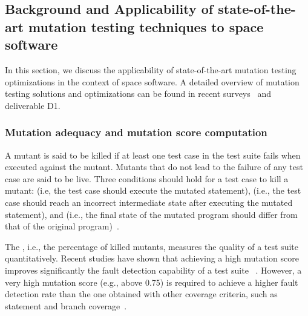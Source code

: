 
\subsection{Background and Applicability of state-of-the-art mutation testing techniques to space software}
\label{sec:background}

In this section, we discuss the applicability of state-of-the-art mutation testing optimizations in the context of space software. A detailed overview of mutation testing solutions and optimizations can be found in recent surveys~\cite{jia2010analysis,papadakis2019mutation} and deliverable D1.

\subsubsection{Mutation adequacy and mutation score computation}
\label{background:adequacy}
A mutant is said to be killed if at least one test case in the test suite fails when executed against the mutant.
Mutants that do not lead to the failure of any test case are said to be live.
Three conditions should hold for a test case to kill a mutant:  (i.e, the test case should execute the mutated statement),  (i.e., the test case should reach an incorrect intermediate state after executing the mutated statement), and  (i.e., the final state of the mutated program should differ from that of the original program)~\cite{offutt1997automatically}.

The , i.e., the percentage of killed mutants, measures the quality of a test suite quantitatively. Recent studies have shown that achieving a high mutation score improves significantly the fault detection capability of a test suite
~\cite{papadakis2018mutation}.
However, a very high mutation score (e.g., above 0.75) is required to achieve a higher fault detection rate than the one obtained with other coverage criteria, such as statement and branch coverage~\cite{Chekam:17}.


